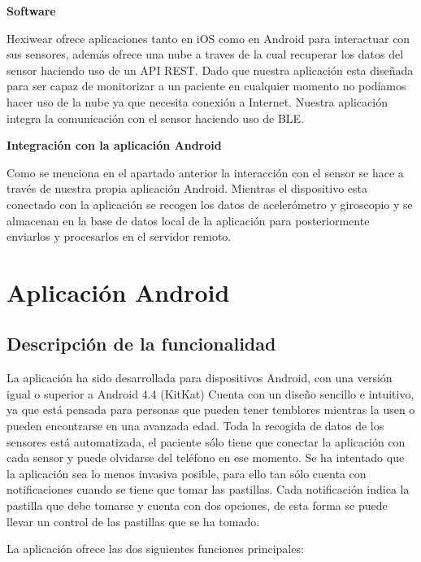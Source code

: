 \documentclass[11pt,spanish]{article}
\begin{document}
{\bf Software}
\newline

Hexiwear ofrece aplicaciones tanto en iOS como en Android para interactuar con sus sensores, además ofrece una nube a traves de la cual recuperar los datos del sensor haciendo uso de un API REST. Dado que nuestra aplicación esta diseñada para ser capaz de monitorizar a un paciente en cualquier momento no podíamos hacer uso de la nube ya que necesita conexión a Internet. Nuestra aplicación integra la comunicación con el sensor haciendo uso de BLE.
\newline

{\bf Integración con la aplicación Android}
\newline

Como se menciona en el apartado anterior la interacción con el sensor se hace a través de nuestra propia aplicación Android. Mientras el dispositivo esta conectado con la aplicación se recogen los datos de acelerómetro y giroscopio y se almacenan en la base de datos local de la aplicación para posteriormente enviarlos y procesarlos en el servidor remoto.
\newpage

\section{Aplicación Android}
\subsection{Descripción de la funcionalidad}
La aplicación ha sido desarrollada para dispositivos Android, con una versión igual o superior a Android 4.4 (KitKat) Cuenta con un diseño sencillo e intuitivo, ya que está pensada para personas que pueden tener temblores mientras la usen o pueden encontrarse en una avanzada edad. Toda la recogida de datos de los sensores está automatizada, el paciente sólo tiene que conectar la aplicación con cada sensor y puede olvidarse del teléfono en ese momento. Se ha intentado que la aplicación sea lo menos invasiva posible, para ello tan sólo cuenta con notificaciones cuando se tiene que tomar las pastillas. Cada notificación indica la pastilla que debe tomarse y cuenta con dos opciones, de esta forma se puede llevar un control de las pastillas que se ha tomado.
\newline

La aplicación ofrece las dos siguientes funciones principales:
\end{document}
